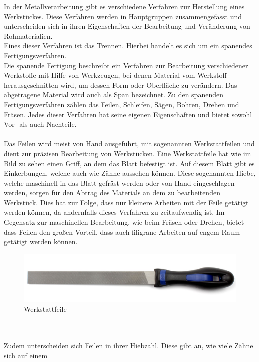 In der Metallverarbeitung gibt es verschiedene Verfahren zur Herstellung eines Werkstückes. Diese Verfahren werden in Hauptgruppen zusammengefasst und
unterscheiden sich in ihren Eigenschaften der Bearbeitung und Veränderung von Rohmaterialien.
\\
Eines dieser Verfahren ist das Trennen. Hierbei handelt es sich um ein spanendes Fertigungsverfahren.
\\
Die spanende Fertigung beschreibt ein Verfahren zur Bearbeitung verschiedener Werkstoffe mit Hilfe von Werkzeugen, bei denen Material vom Werkstoff 
herausgeschnitten wird, um dessen Form oder Oberfläche zu verändern. Das abgetragene Material wird auch als Span bezeichnet.
Zu den spanenden Fertigungsverfahren zählen \zB das Feilen, Schleifen, Sägen, Bohren, Drehen und Fräsen. Jedes dieser Verfahren hat seine eigenen 
Eigenschaften und bietet sowohl Vor- als auch Nachteile.\autocite{Dietrich.2020}
\\\\
Das Feilen wird meist von Hand ausgeführt, mit sogenannten Werkstattfeilen und dient zur präzisen Bearbeitung von Werkstücken. Eine Werkstattfeile hat
wie im Bild zu sehen einen Griff, an dem das Blatt befestigt ist. Auf diesem Blatt gibt es Einkerbungen, welche auch wie Zähne aussehen können. Diese 
sogenannten Hiebe, welche maschinell in das Blatt gefräst werden oder von Hand eingeschlagen werden, sorgen für den Abtrag des Materials an dem zu 
bearbeitenden Werkstück. Dies hat zur Folge, dass nur kleinere Arbeiten mit der Feile getätigt werden können, da andernfalls dieses Verfahren zu 
zeitaufwendig ist. Im Gegensatz zur maschinellen Bearbeitung, wie \zB beim Fräsen oder Drehen, bietet dass Feilen den großen Vorteil, dass auch filigrane 
Arbeiten auf engem Raum getätigt werden können.
\begin{figure}[hbt]
    \centering
    \includegraphics[width=1\linewidth]{images/Werkstattfeile}
    \caption[Werkstattfeile]{Werkstattfeile \autocite{Werkstattfeile}}
    \label{fig:Werkstattfeile}
\end{figure}
\\\\
Zudem unterscheiden sich Feilen in ihrer Hiebzahl. Diese gibt an, wie viele Zähne sich auf einem 
